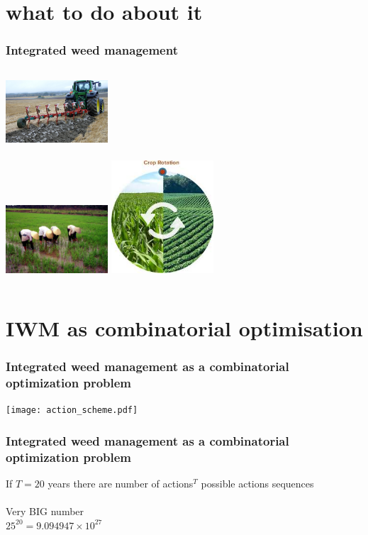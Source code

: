 \documentclass[]{beamer}
\begin{document}
\section{what to do about it}
\begin{frame}
	\frametitle{Integrated weed management}
	 \begin{columns}[c] %
	 \column{2.5in}
	 	\includegraphics[width=1.5in]{Plowing_ecomat}
	 	\\~\\
	 	\includegraphics[width=1.5in]{weeds-manual-hand}	
	 \column{2.5in}
	 	\includegraphics[width=1.5in]{crop-rotation}
	 \end{columns}
\end{frame}

\section{IWM as combinatorial optimisation}  
  \begin{frame}
    \frametitle{Integrated weed management as a combinatorial optimization problem}
	\texttt{[image: action\_scheme.pdf]} 
  \end{frame}
  
  \begin{frame}
    \frametitle{Integrated weed management as a combinatorial optimization problem}
    If $T = 20$ years there are number of actions$^T$ possible actions sequences 
    \\~\\
    Very BIG number\\
    $25^{20} = 9.094947 \times 10^{27}$ 
  \end{frame}
\end{document}
